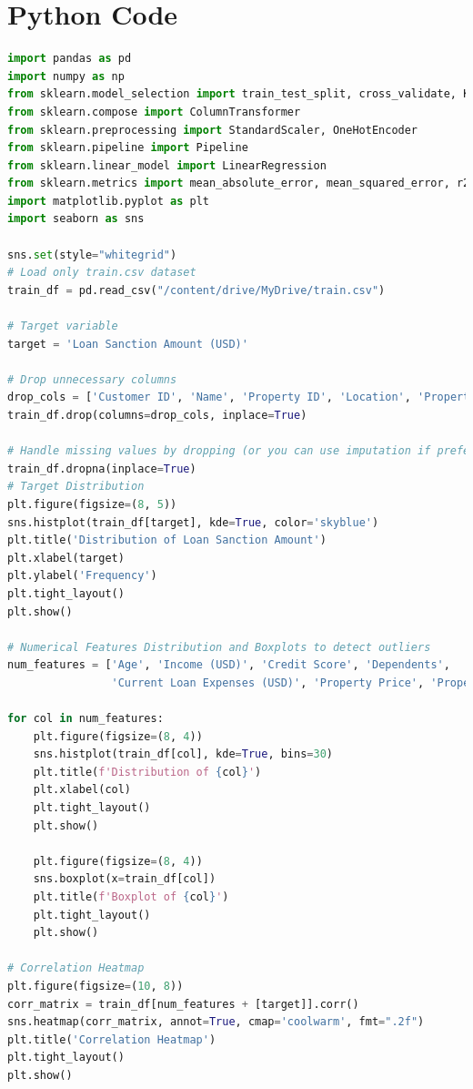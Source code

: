 \documentclass{article}
\begin{document}
\section{Python Code}

\begin{lstlisting}[language=Python, caption=Iris Dataset Classification, basicstyle=\ttfamily\small, breaklines=true]
import pandas as pd
import numpy as np
from sklearn.model_selection import train_test_split, cross_validate, KFold
from sklearn.compose import ColumnTransformer
from sklearn.preprocessing import StandardScaler, OneHotEncoder
from sklearn.pipeline import Pipeline
from sklearn.linear_model import LinearRegression
from sklearn.metrics import mean_absolute_error, mean_squared_error, r2_score
import matplotlib.pyplot as plt
import seaborn as sns

sns.set(style="whitegrid")
# Load only train.csv dataset
train_df = pd.read_csv("/content/drive/MyDrive/train.csv")

# Target variable
target = 'Loan Sanction Amount (USD)'

# Drop unnecessary columns
drop_cols = ['Customer ID', 'Name', 'Property ID', 'Location', 'Property Location']
train_df.drop(columns=drop_cols, inplace=True)

# Handle missing values by dropping (or you can use imputation if preferred)
train_df.dropna(inplace=True)
# Target Distribution
plt.figure(figsize=(8, 5))
sns.histplot(train_df[target], kde=True, color='skyblue')
plt.title('Distribution of Loan Sanction Amount')
plt.xlabel(target)
plt.ylabel('Frequency')
plt.tight_layout()
plt.show()

# Numerical Features Distribution and Boxplots to detect outliers
num_features = ['Age', 'Income (USD)', 'Credit Score', 'Dependents',
                'Current Loan Expenses (USD)', 'Property Price', 'Property Age']

for col in num_features:
    plt.figure(figsize=(8, 4))
    sns.histplot(train_df[col], kde=True, bins=30)
    plt.title(f'Distribution of {col}')
    plt.xlabel(col)
    plt.tight_layout()
    plt.show()

    plt.figure(figsize=(8, 4))
    sns.boxplot(x=train_df[col])
    plt.title(f'Boxplot of {col}')
    plt.tight_layout()
    plt.show()

# Correlation Heatmap
plt.figure(figsize=(10, 8))
corr_matrix = train_df[num_features + [target]].corr()
sns.heatmap(corr_matrix, annot=True, cmap='coolwarm', fmt=".2f")
plt.title('Correlation Heatmap')
plt.tight_layout()
plt.show()


\end{lstlisting}
\end{document}
